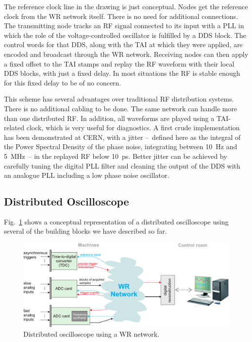 \documentclass{../JAC2003}
\begin{document}
The reference clock line in the drawing is just conceptual. Nodes get
the reference clock from the WR network itself. There is no need for
additional connections. The transmitting node tracks an RF signal
connected to its input with a PLL in which the role of the
voltage-controlled oscillator is fulfilled by a DDS block. The control
words for that DDS, along with the TAI at which they were applied, are
encoded and broadcast through the WR network. Receiving nodes can then
apply a fixed offset to the TAI stamps and replay the RF waveform with
their local DDS blocks, with just a fixed delay. In most situations
the RF is stable enough for this fixed delay to be of no concern.

This scheme has several advantages over traditional RF distribution
systems. There is no additional cabling to be done. The same network
can handle more than one distributed RF. In addition, all waveforms
are played using a TAI-related clock, which is very useful for
diagnostics. A first crude implementation has been demonstrated at
CERN, with a jitter --~defined here as the integral of the Power
Spectral Density of the phase noise, integrating between 10~Hz and
5~MHz~-- in the replayed RF below 10~ps. Better jitter can be achieved
by carefully tuning the digital PLL filter and cleaning the output of
the DDS with an analogue PLL including a low phase noise oscillator.

\subsection{Distributed Oscilloscope}

Fig.~\ref{oscilloscope-fig} shows a conceptual representation of a
distributed oscilloscope using several of the building blocks we have
described so far. 

\begin{figure}[htb]
   \centering
   \includegraphics*[width=\columnwidth]{applications/distributed_daq.pdf}
   \caption{Distributed oscilloscope using a WR network.}
   \label{oscilloscope-fig}
\end{figure}
\end{document}
